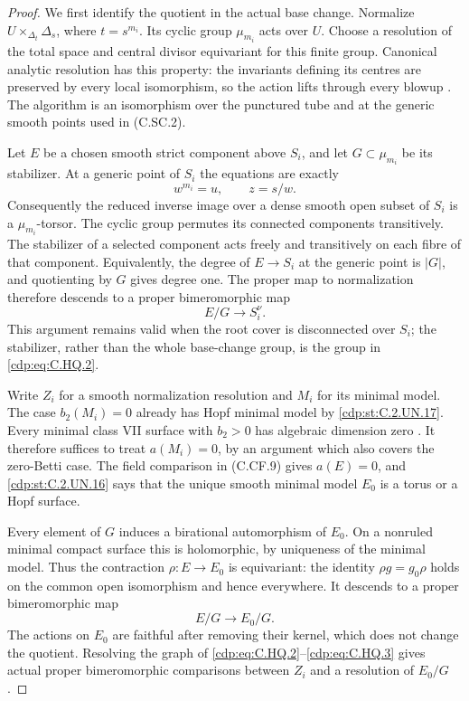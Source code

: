 \begin{proof}
We first identify the quotient in the actual base change.
Normalize $U\times_{\Delta_t}\Delta_s$, where
$t=s^{m_i}$. Its cyclic group $\mu_{m_i}$ acts over $U$.
Choose a resolution of the total space and central divisor
equivariant for this finite group. Canonical analytic
resolution has this property: the invariants defining its
centres are preserved by every local isomorphism, so the
action lifts through every blowup
\cite[\S1, universal and canonical desingularization]{BierstoneMilman1997}.
The algorithm is an isomorphism over the punctured tube
and at the generic smooth points used in (C.SC.2).

Let $E$ be a chosen smooth strict component above $S_i$,
and let $G\subset\mu_{m_i}$ be its stabilizer. At a
generic point of $S_i$ the equations are exactly
\[
                 w^{m_i}=u,\qquad z=s/w.
 \tag{C.HQ.1}\label{cdp:eq:C.HQ.1}
\]
Consequently the reduced inverse image over a dense
smooth open subset of $S_i$ is a $\mu_{m_i}$-torsor.
The cyclic group permutes its connected components
transitively. The stabilizer of a selected component
acts freely and transitively on each fibre of that
component. Equivalently, the degree of $E\to S_i$
at the generic point is $|G|$, and quotienting by
$G$ gives degree one. The proper map to normalization
therefore descends to a proper bimeromorphic map
\[
                         E/G\longrightarrow S_i^\nu.
 \tag{C.HQ.2}\label{cdp:eq:C.HQ.2}
\]
This argument remains valid when the root cover is
disconnected over $S_i$; the stabilizer, rather than
the whole base-change group, is the group in \eqref{cdp:eq:C.HQ.2}.

Write $Z_i$ for a smooth normalization resolution and
$M_i$ for its minimal model. The case $b_2(M_i)=0$
already has Hopf minimal model by \ref{cdp:st:C.2.UN.17}. Every
minimal class VII surface with $b_2>0$ has algebraic
dimension zero \cite[p.~256]{DOT2000}. It therefore
suffices to treat $a(M_i)=0$, by an argument which
also covers the zero-Betti case. The field comparison
in (C.CF.9) gives
$a(E)=0$, and \ref{cdp:st:C.2.UN.16} says that the unique smooth
minimal model $E_0$ is a torus or a Hopf surface.

Every element of $G$ induces a birational automorphism
of $E_0$. On a nonruled minimal compact surface this
is holomorphic, by uniqueness of the minimal model.
Thus the contraction $\rho:E\to E_0$ is equivariant:
the identity $\rho g=g_0\rho$ holds on the common
open isomorphism and hence everywhere. It descends
to a proper bimeromorphic map
\[
                    E/G\longrightarrow E_0/G.
 \tag{C.HQ.3}\label{cdp:eq:C.HQ.3}
\]
The actions on $E_0$ are faithful after removing
their kernel, which does not change the quotient.
Resolving the graph of \eqref{cdp:eq:C.HQ.2}--\eqref{cdp:eq:C.HQ.3} gives
actual proper bimeromorphic comparisons between
$Z_i$ and a resolution of $E_0/G$.


\end{proof}

